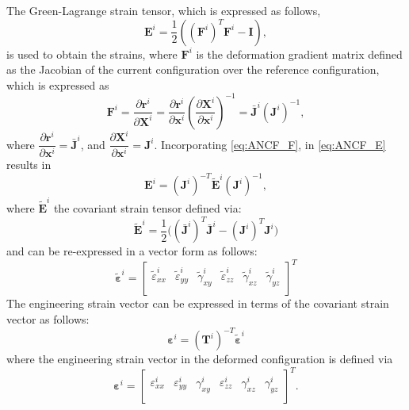 The Green-Lagrange strain tensor, which is expressed as follows, 
\begin{equation} 
{{\mathbf{E}}^{i}}=\frac{1}{2}\left( {{\left( {{\mathbf{F}}^{i}} \right)}^{T}}{{\mathbf{F}}^{i}}-\mathbf{I} \right),
\label{eq:ANCF_E}
\end{equation}
is used to obtain the strains, where ${\mathbf{F}}^{i}$ is the deformation gradient matrix defined as the Jacobian of the current configuration over the reference configuration, which is expressed as 
\begin{equation} 
{{\mathbf{F}}^{i}}=\frac{\partial {{\mathbf{r}}^{i}}}{\partial {{\mathbf{X}}^{i}}}=\frac{\partial {{\mathbf{r}}^{i}}}{\partial {{\mathbf{x}}^{i}}}{{\left( \frac{\partial {{\mathbf{X}}^{i}}}{\partial {{\mathbf{x}}^{i}}} \right)}^{-1}}=  \bar {\bm J}^i  ({\bm J^i})^{-1}, \label{eq:ANCF_F}
\end{equation}
where $\dfrac{\partial {{\mathbf{r}}^{i}}}{\partial {{\mathbf{x}}^{i}}}=\bar {\bm J}^i$, and ${{ \dfrac{\partial {{\mathbf{X}}^{i}}}{\partial {{\mathbf{x}}^{i}}} }}= {\bm J^i}$. Incorporating \ref{eq:ANCF_F}, in \ref{eq:ANCF_E} results in
\begin{equation}
\bm{E}^i=({\bm{J}^i})^{-T} \tilde{\bm{E}}^i ({\bm{J}^i})^{-1},
\label{eq:ANCF_E2}
\end{equation}
where $\tilde{\bm{E}}^i$ the covariant strain tensor defined via:
\begin{equation}
{\tilde{\bm{E}}}^i=\frac{1}{2}\big( (\bar {\bm J}^i)^{T}  \bar {\bm J}^i -  (\bm J^i)^{T}  {\bm J}^i  \big)
\label{eq:ANCF_E_tilde}
\end{equation}
and can be re-expressed in a vector form as follows:
\begin{equation} \label{eq:equ7}
{{\bm{\tilde{\varepsilon} }}^{i}}={{\left[ \begin{matrix}
		\tilde{\varepsilon} _{xx}^{i} & \tilde{\varepsilon} _{yy}^{i} & \tilde{\gamma} _{xy}^{i} & \tilde{\varepsilon} _{zz}^{i} & \tilde{\gamma} _{xz}^{i} & \tilde{\gamma} _{yz}^{i} \\
		\end{matrix} \right]}^{T}}
\end{equation}
The engineering strain vector can be expressed in terms of the covariant strain vector as follows:
\begin{equation}
{{\bm{\varepsilon }}^{i}}=(\bm {T}^i)^{-T} {{\bm{\tilde{\varepsilon} }}^{i}}
\end{equation}
where the  engineering strain vector in the deformed configuration is defined via  
\begin{equation} \label{eq:equ8}
{{\bm{\varepsilon }}^{i}}={{\left[ \begin{matrix}
		\varepsilon _{xx}^{i} & \varepsilon _{yy}^{i} & \gamma _{xy}^{i} & \varepsilon _{zz}^{i} & \gamma _{xz}^{i} & \gamma _{yz}^{i} \\
		\end{matrix} \right]}^{T}}.
\end{equation}
